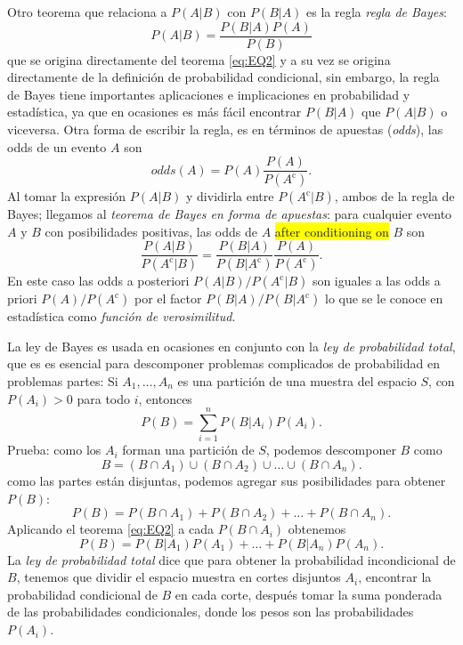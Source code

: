 \documentclass[letterpaper]{article}
\begin{document}
Otro teorema que relaciona a $P(A|B)$ con $P(B|A)$ es la regla \emph{regla de Bayes}:
\begin{equation}
P(A|B)=\frac{P(B|A)P(A)}{P(B)}
\end{equation}
que se origina directamente del teorema \eqref{eq:EQ2} y a su vez se origina directamente de la definición de probabilidad condicional, sin embargo, la regla de Bayes tiene importantes aplicaciones e implicaciones en probabilidad y estadística, ya que en ocasiones es más fácil encontrar $P(B|A)$ que $P(A|B)$ o viceversa. Otra forma de escribir la regla, es en términos de apuestas (\emph{odds}), las odds de un evento $A$ son
\begin{equation}
odds(A)=P(A)\frac{P(A)}{P(A^\text{c})}.
\end{equation}
Al tomar la expresión $P(A|B)$ y dividirla entre $P(A^\text{c}|B)$, ambos de la regla de Bayes; llegamos al \emph{teorema de Bayes en forma de apuestas}: para cualquier evento $A$ y $B$ con posibilidades positivas, las odds de $A$ \colorbox{yellow}{after conditioning on} $B$ son
\begin{equation}
\frac{P(A|B)}{P(A^\text{c}|B)}=\frac{P(B|A)}{P(B|A^\text{c})}\frac{P(A)}{P(A^\text{c})}.
\end{equation}
En este caso las odds a posteriori $P(A|B)/P(A^\text{c}|B)$ son iguales a las odds a priori $P(A)/P(A^\text{c})$ por el factor $P(B|A)/P(B|A^\text{c})$ lo que se le conoce en estadística como \emph{función de verosimilitud}.

La ley de Bayes es usada en ocasiones en conjunto con la \emph{ley de probabilidad total}, que es es esencial para descomponer problemas complicados de probabilidad en problemas partes: Si $A_1,\ldots,A_n$ es una partición de una muestra del espacio $S$, con $P(A_i)>0$ para todo $i$, entonces
\begin{equation}
P(B)=\sum_{i=1}^{n}P(B|A_i)P(A_i).
\end{equation}
Prueba: como los $A_i$ forman una partición de $S$, podemos descomponer $B$ como
\begin{equation}
B=(B\cap A_1)\cup(B\cap A_2)\cup\ldots\cup(B\cap A_n).
\end{equation}
como las partes están disjuntas, podemos agregar sus posibilidades para obtener $P(B)$:
\begin{equation}
P(B)=P(B\cap A_1)+P(B\cap A_2)+\ldots+P(B\cap A_n).
\end{equation}
Aplicando el teorema \eqref{eq:EQ2} a cada $P(B\cap A_i)$ obtenemos
\begin{equation}
P(B)=P(B|A_1)P(A_1)+\ldots+P(B|A_n)P(A_n).
\end{equation}
La \emph{ley de probabilidad total} dice que para obtener la probabilidad incondicional de $B$, tenemos que dividir el espacio muestra en cortes disjuntos $A_i$, encontrar la probabilidad condicional de $B$ en cada corte, después tomar la suma ponderada de las probabilidades condicionales, donde los pesos son las probabilidades $P(A_i)$.
\end{document}

